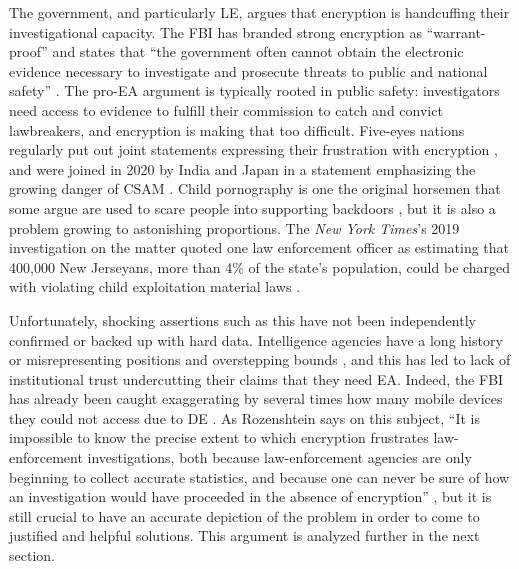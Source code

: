 The government, and particularly \acl{LE}, argues that encryption is handcuffing their investigational capacity. The
\ac{FBI} has branded strong encryption as ``warrant-proof'' and states that ``the government often cannot obtain the
electronic evidence necessary to investigate and prosecute threats to public and national safety'' \cite{fbi_2020}. The
pro-\ac{EA} argument is typically rooted in public safety: investigators need access to evidence to fulfill their
commission to catch and convict lawbreakers, and encryption is making that too difficult. Five-eyes nations regularly
put out joint statements expressing their frustration with encryption \cite{ministerial_2018} \cite{goodale_2017}, and
were joined in 2020 by India and Japan in a statement emphasizing the growing danger of \ac{CSAM} \cite{intl_2020}.
Child pornography is one the original \ac{horsemen} that some argue are used to scare people into supporting backdoors
\cite{schneier_scaring_2019}, but it is also a problem growing to astonishing proportions. The \textit{New York Times}'s
2019 investigation on the matter quoted one law enforcement officer as estimating that 400,000 New Jerseyans, more than
4\% of the state's population, could be charged with violating child exploitation material laws
\cite{keller_internet_2019}.

Unfortunately, shocking assertions such as this have not been independently confirmed or backed up with hard data.
Intelligence agencies have a long history or misrepresenting positions and overstepping bounds
\cite{johnson_congressional_2004} \cite{shamsi_2011}, and this has led to lack of institutional trust undercutting their
claims that they need \ac{EA}. Indeed, the \ac{FBI} has already been caught exaggerating by several times how many
mobile devices they could not access due to \acl{DE} \cite{devlin_2018}. As Rozenshtein says on this subject, ``It is
impossible to know the precise extent to which encryption frustrates law-enforcement investigations, both because
law-enforcement agencies are only beginning to collect accurate statistics, and because one can never be sure of how an
investigation would have proceeded in the absence of encryption'' \cite{rozenshtein_wicked_2018}, but it is still
crucial to have an accurate depiction of the problem in order to come to justified and helpful solutions. This argument
is analyzed further in the next section.

